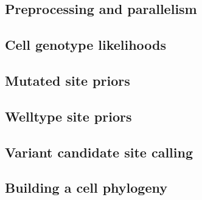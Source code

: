 \documentclass[../main.tex]{subfiles}
\begin{document}


\subsection{Preprocessing and parallelism}


\subsection{Cell genotype likelihoods}


\subsection{Mutated site priors}


\subsection{Welltype site priors}


\subsection{Variant candidate site calling}


\subsection{Building a cell phylogeny}



\end{document}
